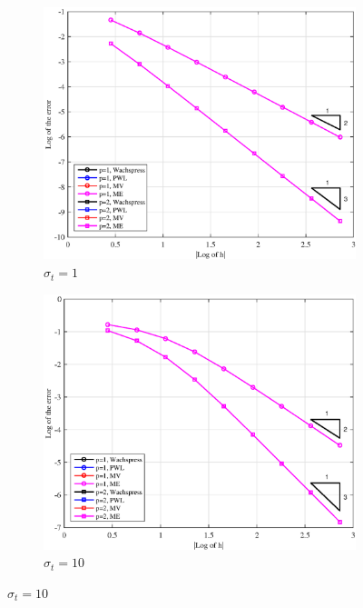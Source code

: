 \begin{figure}
\centering
{
	\begin{subfigure}[b]{0.485\textwidth}
		\centering
		\label{subfig::PA_LeftTop_Tri_sig1}
		\includegraphics[width=\textwidth]{figures/sec_BF/PAErr_LeftTop_Tri_sig1.eps}
	\caption{$\sigma_t = 1$}
	\end{subfigure}
	\hfill
	\begin{subfigure}[b]{0.485\textwidth}
		\centering
		\label{subfig::PA_LeftTop_Tri_sig10}
		\includegraphics[width=\textwidth]{figures/sec_BF/PAErr_LeftTop_Tri_sig10.eps}
	\caption{$\sigma_t = 10$}

\end{subfigure}}
\end{figure}
